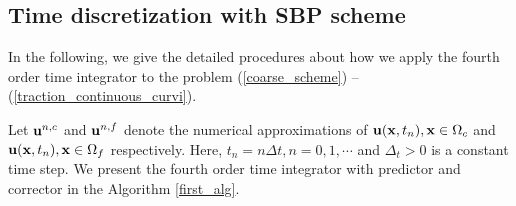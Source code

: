 \subsection{Time discretization with SBP scheme}
In the following, we give the detailed procedures about how we apply the fourth order time integrator to the problem (\ref{coarse_scheme}) -- (\ref{traction_continuous_curvi}). 

Let ${\bf u}^{n,c}$ and ${\bf u}^{n,f}$ denote the numerical approximations of ${\bf u}({\bf x},t_n), {\bf x}\in\Omega_c$ and ${\bf u}({\bf x},t_n), {\bf x}\in\Omega_f$ respectively. Here, $t_n = n\Delta t, n = 0,1,\cdots$ and $\Delta_t > 0$ is a constant time step. We present the fourth order time integrator with predictor and corrector in the Algorithm \ref{first_alg}.

